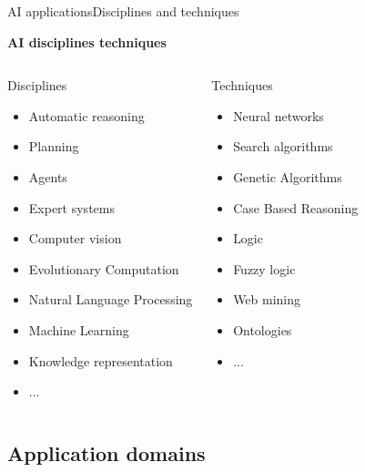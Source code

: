 \documentclass[10pt,compress]{beamer} %
\begin{document}
\begin{frame}{AI applications}{Disciplines and techniques}
	\vspace{-0.4cm}
	\begin{center}
		\textbf{AI disciplines techniques}
	\end{center}
	\begin{columns}
	   		\begin{block}{Disciplines}
			\begin{itemize}
			\item Automatic reasoning
			\item Planning
			\item Agents
			\item Expert systems
			\item Computer vision
			\item Evolutionary Computation
			\item Natural Language Processing
			\item Machine Learning
			\item Knowledge representation
			\item ...
			\end{itemize}
			\end{block}
	   		\begin{block}{Techniques}
			\begin{itemize}
			\item Neural networks
			\item Search algorithms
			\item Genetic Algorithms
			\item Case Based Reasoning
			\item Logic
			\item Fuzzy logic
			\item Web mining
			\item Ontologies
			\item ...
			\end{itemize}
			\end{block}
	\end{columns}
\end{frame}

\subsection{Application domains}
\end{document}
